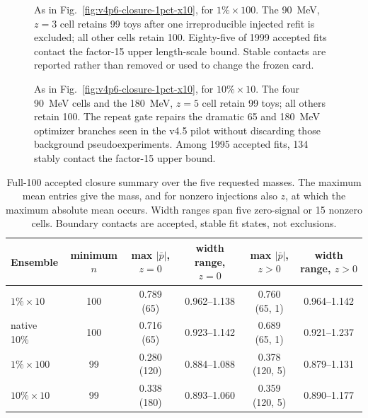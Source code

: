 \begin{figure}[p]
\centering
{}
\caption{As in Fig.~\ref{fig:v4p6-closure-1pct-x10}, for $1\%\times100$.  The
90~MeV, $z=3$ cell retains 99 toys after one irreproducible injected refit is excluded;
all other cells retain 100.  Eighty-five of 1999 accepted fits contact the factor-15
upper length-scale bound.  Stable contacts are reported rather than removed or used to
change the frozen card.}
\label{fig:v4p6-closure-1pct-x100}
\end{figure}

\begin{figure}[p]
\centering
{}
\caption{As in Fig.~\ref{fig:v4p6-closure-1pct-x10}, for $10\%\times10$.  The four
90~MeV cells and the 180~MeV, $z=5$ cell retain 99 toys; all others retain 100.  The
repeat gate repairs the dramatic 65 and 180~MeV optimizer branches seen in the v4.5
pilot without discarding those background pseudoexperiments.  Among 1995 accepted
fits, 134 stably contact the factor-15 upper bound.}
\label{fig:v4p6-closure-10pct-x10}
\end{figure}

\clearpage
\begin{table}[H]
\centering
\small
\caption{Full-100 accepted closure summary over the five requested masses.  The
maximum mean entries give the mass, and for nonzero injections also $z$, at which the
maximum absolute mean occurs.  Width ranges span five zero-signal or 15 nonzero cells.
Boundary contacts are accepted, stable fit states, not exclusions.}
\label{tab:v4p6-refmatched-summary}
\begin{tabular}{lccccc}
\toprule
Ensemble & minimum $n$ & max $|\bar p|$, $z=0$ & width range, $z=0$ &
max $|\bar p|$, $z>0$ & width range, $z>0$ \\
\midrule
$1\%\times10$  & 100 & 0.789 (65)  & 0.962--1.138 & 0.760 (65, 1)  & 0.964--1.142 \\
native 10\%     & 100 & 0.716 (65)  & 0.923--1.142 & 0.689 (65, 1)  & 0.921--1.237 \\
$1\%\times100$ &  99 & 0.280 (120) & 0.884--1.088 & 0.378 (120, 5) & 0.879--1.131 \\
$10\%\times10$ &  99 & 0.338 (180) & 0.893--1.060 & 0.359 (120, 5) & 0.890--1.177 \\
\bottomrule
\end{tabular}
\end{table}

